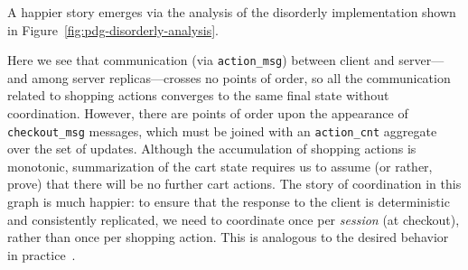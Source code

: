 A happier story emerges via the analysis of the disorderly implementation
shown in Figure~\ref{fig:pdg-disorderly-analysis}.

Here we see that communication (via \texttt{action\_msg}) between client and
server---and among server replicas---crosses no points of order, so all the
communication related to shopping actions converges to the same final state without coordination.
However, there are points of order upon the appearance of \texttt{checkout\_msg}
messages, which must be joined with an \texttt{action\_cnt} aggregate over the set of updates.  Although the 
accumulation of shopping actions is monotonic, summarization of the cart state
requires us to assume (or rather, prove) that there will be no further cart actions.
The story of coordination in this graph is much happier: to
ensure that the response to the client is deterministic and consistently replicated, we need to coordinate once per {\em session} (at checkout), rather than once per shopping action.  This is analogous to the desired behavior in practice~\cite{quicksand}.
%

